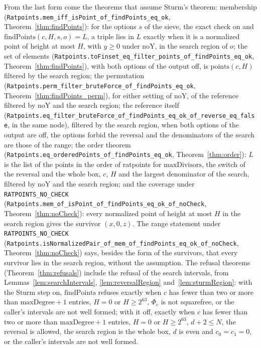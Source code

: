 From the last form come the theorems that assume Sturm's theorem: membership
(\verb|Ratpoints.mem_iff_isPoint_of_findPoints_eq_ok|, Theorem~\ref{thm:findPoints}): for the
options $s$ of the sieve, the exact check on and $\mathrm{findPoints}(c, H, s, o) = L$, a triple
lies in $L$ exactly when it is a normalized point of height at most $H$, with $y \ge 0$ under
$\mathrm{noY}$, in the search region of $o$; the set of elements
(\verb|Ratpoints.toFinset_eq_filter_points_of_findPoints_eq_ok|, Theorem~\ref{thm:findPoints}), with
both options of the output off, is $\mathrm{points}(c, H)$ filtered by the search region; the
permutation (\verb|Ratpoints.perm_filter_bruteForce_of_findPoints_eq_ok|,
Theorem~\ref{thm:findPoints_perm}), for either setting of $\mathrm{noY}$, of the reference filtered
by $\mathrm{noY}$ and the search region; the reference itself
(\verb|Ratpoints.eq_filter_bruteForce_of_findPoints_eq_ok_of_reverse_eq_false|, in the same node),
filtered by the search region, when both options of the output are off, the options forbid the
reversal and the denominators of the search are those of the range; the order theorem
(\verb|Ratpoints.eq_orderedPoints_of_findPoints_eq_ok|, Theorem~\ref{thm:order}): $L$ is the list of
the points in the order of ratpoints for $\mathrm{maxDivisors}$, the switch of the reversal and the
whole box, $c$, $H$ and the largest denominator of the search, filtered by $\mathrm{noY}$ and the
search region; and the coverage under \verb|RATPOINTS_NO_CHECK|
(\verb|Ratpoints.mem_of_isPoint_of_findPoints_eq_ok_of_noCheck|, Theorem~\ref{thm:noCheck}): every
normalized point of height at most $H$ in the search region gives the survivor $(x, 0, z)$. The
range statement under \verb|RATPOINTS_NO_CHECK|
(\verb|Ratpoints.isNormalizedPair_of_mem_of_findPoints_eq_ok_of_noCheck|, Theorem~\ref{thm:noCheck}) says,
besides the form of the survivors, that every survivor lies in the search region, without the
assumption. The refusal theorems (Theorem~\ref{thm:refusals}) include the refusal of the search
intervals, from Lemmas~\ref{lem:searchIntervals}, \ref{lem:reversalRegion}
and~\ref{lem:sturmRegion}: with the Sturm step on, $\mathrm{findPoints}$ refuses exactly when $c$
has fewer than two or more than $\mathrm{maxDegree} + 1$ entries, $H = 0$ or $H \ge 2^{63}$,
$\Phi_c$ is not squarefree, or the caller's intervals are not well formed; with it off, exactly when
$c$ has fewer than two or more than $\mathrm{maxDegree} + 1$ entries, $H = 0$ or $H \ge 2^{63}$,
$d + 2 \le N$, the reversal is allowed, the search region is the whole box, $d$ is even and
$c_0 = c_1 = 0$, or the caller's intervals are not well formed.

